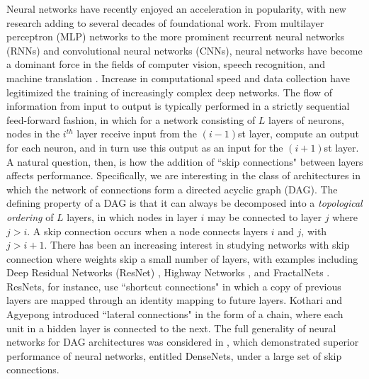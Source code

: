 \documentclass{jcmlatex}
\begin{document}
Neural networks have recently enjoyed an acceleration in popularity, with new research adding to several decades of foundational work. From multilayer perceptron (MLP) networks to the more prominent recurrent neural networks (RNNs) and convolutional neural networks (CNNs), neural networks have become a dominant force in the fields of computer vision, speech recognition, and machine translation \cite{rosenblatt1961principles}. Increase in computational speed and data collection have legitimized the training of increasingly complex deep networks. The flow of information from input to output is typically performed in a strictly sequential feed-forward fashion, in which for a network consisting of   $L$ layers of neurons,  nodes in the $i^{th}$ layer receive input from the $(i-1)$st layer, compute an output for each neuron, and in turn use this output as an input for the $(i+1)$st  layer. A natural question, then, is how the addition of ``skip connections" between layers affects performance.  Specifically, we are interesting in the class of architectures in which the network of connections form a directed acyclic graph (DAG).  The defining property of a DAG is that it can always be decomposed into a \textit{topological ordering} of $L$ layers, in which nodes in layer $i$ may be connected to layer $j$ where $j>i$.  A skip connection occurs when a node connects layers $i$ and $j$, with $j>i+1$.
There has been an increasing interest in studying networks with skip connection where weights skip a small number of layers, with examples including Deep Residual Networks (ResNet) \cite{he2016deep},  Highway Networks \cite{srivastava2015training}, and FractalNets \cite{larsson2016fractalnet}.  ResNets, for instance,  use ``shortcut connections" in which a copy of previous layers are mapped through an identity mapping to future layers. Kothari and Agyepong \cite{kothari1996lateral} introduced  ``lateral connections" in the form of a chain, where each unit in a hidden layer is connected to the next. %
The full generality of neural networks for DAG architectures was considered in \cite{huang2016densely}, which demonstrated superior performance of neural networks, entitled DenseNets, under a large set of skip connections.  
\end{document}
